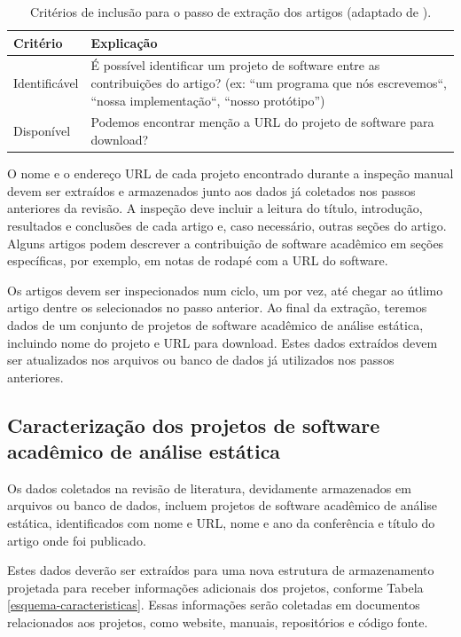 \begin{table}[h]
\caption{Critérios de inclusão para o passo de extração dos artigos (adaptado de ).}
\centering
\begin{tabular}{ l p{12cm} }
  \hline
  Critério         & Explicação \\
  \hline
  Identificável    & É possível identificar um projeto de software entre as contribuições do artigo? (ex: ``um programa que nós escrevemos``, ``nossa implementação``, ``nosso protótipo'') \\
  Disponível       & Podemos encontrar menção a URL do projeto de software para download? \\
  \hline
\end{tabular}
\label{criterios-extracao}
\end{table}

O nome e o endereço URL de cada projeto encontrado durante a inspeção manual
devem ser extraídos e armazenados junto aos dados já coletados nos passos
anteriores da revisão. A inspeção deve incluir a leitura do título, introdução,
resultados e conclusões de cada artigo e, caso necessário, outras
seções do artigo. Alguns artigos podem descrever a contribuição de software acadêmico
em seções específicas, por exemplo, em
notas de rodapé com a URL do software.

Os artigos devem ser inspecionados num ciclo, um por vez, até chegar ao útlimo
artigo dentre os selecionados no passo anterior. Ao final da extração, teremos
dados de um conjunto de projetos de software acadêmico de análise estática,
incluindo nome do projeto e URL para download. Estes dados extraídos devem ser
atualizados nos arquivos ou banco de dados já utilizados nos passos anteriores.

\subsection{Caracterização dos projetos de software acadêmico de análise estática}

Os dados coletados na revisão de literatura, devidamente armazenados em
arquivos ou banco de dados, incluem projetos de software acadêmico de análise
estática, identificados com nome e URL, nome e ano da conferência e
título do artigo onde foi publicado.

Estes dados deverão ser extraídos para uma nova estrutura de armazenamento
projetada para receber informações adicionais dos projetos, conforme Tabela
\ref{esquema-caracteristicas}. Essas informações serão coletadas em documentos
relacionados aos projetos, como website, manuais, repositórios e código fonte.

